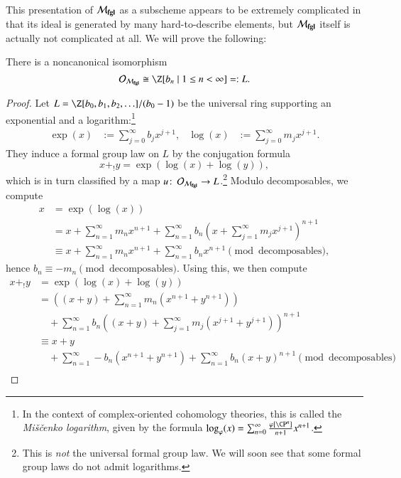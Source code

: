 This presentation of $\mathcal{M}_{\mathbf{fgl}}$ as a subscheme appears to be extremely complicated in that its ideal is generated by many hard-to-describe elements, but $\mathcal{M}_{\mathbf{fgl}}$ itself is actually not complicated at all.  We will prove the following:
\begin{theorem}\label{LazardsTheorem}
There is a noncanonical isomorphism \[\sheaf{O}_{\moduli{fgl}} \cong \Z[b_n \mid 1 \le n < \infty] =: L.\]
\end{theorem}
\begin{proof}
Let $L = \Z[b_0, b_1, b_2, \ldots] / (b_0 - 1)$ be the universal ring supporting an exponential and a logarithm:\footnote{In the context of complex-oriented cohomology theories, this is called the \textit{Mi\v{s}\v{c}enko logarithm}, given by the formula $\log_\phi(x) = \sum_{n=0}^\infty \frac{\phi[\CP^n]}{n+1} x^{n+1}$.}
\begin{align*}
\exp(x) & := \sum_{j=0}^\infty b_j x^{j+1}, &
\log(x) & := \sum_{j=0}^\infty m_j x^{j+1}.
\end{align*}
They induce a formal group law on $L$ by the conjugation formula \[x +_! y = \exp(\log(x) + \log(y)),\] which is in turn classified by a map $u\colon\thinspace \mathcal{O}_{\mathcal{M}_{\mathbf{fgl}}} \to L$.\footnote{This is \emph{not} the universal formal group law.  We will soon see that some formal group laws do not admit logarithms.}  Modulo decomposables, we compute
\begin{align*}
x & = \exp(\log(x)) \\
& = x + \sum_{n=1}^\infty m_n x^{n+1} + \sum_{n=1}^\infty b_n \left( x + \sum_{j=1}^\infty m_j x^{j+1} \right)^{n+1} \\
& \equiv x + \sum_{n=1}^\infty m_n x^{n+1} + \sum_{n=1}^\infty b_n x^{n+1} \pmod{\text{decomposables}},
\end{align*}
hence $b_n \equiv -m_n \pmod{\text{decomposables}}$.  Using this, we then compute
\begin{align*}
x +_! y & = \exp(\log(x) + \log(y)) \\
& = \left( (x + y) + \sum_{n=1}^\infty m_n (x^{n+1} + y^{n+1}) \right) \\
& \quad + \sum_{n=1}^\infty b_n \left( (x + y) + \sum_{j=1}^\infty m_j (x^{j+1} + y^{j+1}) \right)^{n+1} \\
& \equiv x + y \\
& \quad + \sum_{n=1}^\infty -b_n (x^{n+1} + y^{n+1}) + \sum_{n=1}^\infty b_n (x+y)^{n+1} \pmod{\text{decomposables}} \\

\end{align*}
\end{proof}
